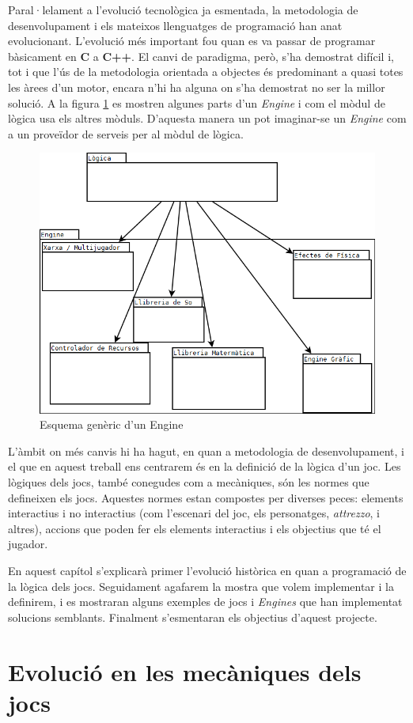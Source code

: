 Paral·lelament a l'evolució tecnològica ja esmentada, la metodologia de desenvolupament i els mateixos llenguatges de programació han anat evolucionant. L'evolució més important fou quan es va passar de programar bàsicament en {\bf C} a {\bf C++}. El canvi de paradigma, però, s'ha demostrat difícil i, tot i que l'ús de la metodologia orientada a objectes és predominant a quasi totes les àrees d'un motor, encara n'hi ha alguna on s'ha demostrat no ser la millor solució. A la figura \ref{fig:EsquemaEngine} es mostren algunes parts d'un {\em Engine} i com el mòdul de lògica usa els altres mòduls. D'aquesta manera un pot imaginar-se un {\em Engine} com a un proveïdor de serveis per al mòdul de lògica.


\begin{figure}
  \centering
  \includegraphics[width=0.58\linewidth]{./img/EsquemaEngine.png}
  \caption{Esquema genèric d'un Engine \label{fig:EsquemaEngine}}
\end{figure}

L'àmbit on més canvis hi ha hagut, en quan a metodologia de desenvolupament, i el que en aquest treball ens centrarem és en la definició de la lògica d'un joc. Les lògiques dels jocs, també conegudes com a mecàniques, són les normes que defineixen els jocs. Aquestes normes estan compostes per diverses peces: elements interactius i no interactius (com l'escenari del joc, els personatges, {\em attrezzo}, i altres), accions que poden fer els elements interactius i els objectius que té el jugador.

En aquest capítol s'explicarà primer l'evolució històrica en quan a programació de la lògica dels jocs. Seguidament agafarem la mostra que volem implementar i la definirem, i es mostraran alguns exemples de jocs i {\em Engines} que han implementat solucions semblants. Finalment s'esmentaran els objectius d'aquest projecte.

\section{Evolució en les mecàniques dels jocs}

